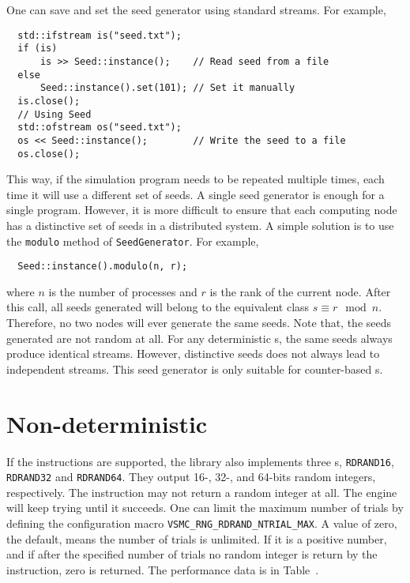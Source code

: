One can save and set the seed generator using standard \cpp streams. For
example,
\begin{Verbatim}
  std::ifstream is("seed.txt");
  if (is)
      is >> Seed::instance();    // Read seed from a file
  else
      Seed::instance().set(101); // Set it manually
  is.close();
  // Using Seed
  std::ofstream os("seed.txt");
  os << Seed::instance();        // Write the seed to a file
  os.close();
\end{Verbatim}
This way, if the simulation program needs to be repeated multiple times, each
time it will use a different set of seeds. A single seed generator is enough
for a single program. However, it is more difficult to ensure that each
computing node has a distinctive set of seeds in a distributed system. A simple
solution is to use the \verb|modulo| method of \verb|SeedGenerator|. For
example,
\begin{Verbatim}
  Seed::instance().modulo(n, r);
\end{Verbatim}
where $n$ is the number of processes and $r$ is the rank of the current node.
After this call, all seeds generated will belong to the equivalent class $s
\equiv r \mod n$. Therefore, no two nodes will ever generate the same seeds.
Note that, the seeds generated are not random at all. For any deterministic
\rng{}s, the same seeds always produce identical streams. However, distinctive
seeds does not always lead to independent streams. This seed generator is only
suitable for counter-based \rng{}s.

\section{Non-deterministic \protect\rng}
\label{sec:Non-deterministic RNG}

If the \rdrand instructions are supported, the library also implements three
\rng{}s, \verb|RDRAND16|, \verb|RDRAND32| and \verb|RDRAND64|. They output 16-,
32-, and 64-bits random integers, respectively. The \rdrand instruction may not
return a random integer at all. The \rng engine will keep trying until it
succeeds. One can limit the maximum number of trials by defining the
configuration macro \verb|VSMC_RNG_RDRAND_NTRIAL_MAX|. A value of zero, the
default, means the number of trials is unlimited. If it is a positive number,
and if after the specified number of trials no random integer is return by the
\rdrand instruction, zero is returned. The performance data is in
Table~.

